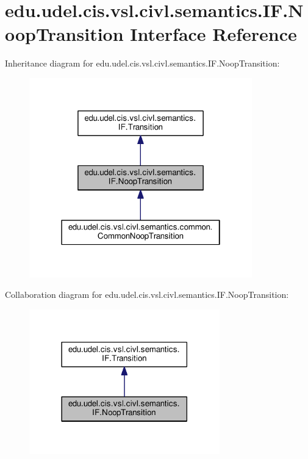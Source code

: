 \hypertarget{interfaceedu_1_1udel_1_1cis_1_1vsl_1_1civl_1_1semantics_1_1IF_1_1NoopTransition}{}\section{edu.\+udel.\+cis.\+vsl.\+civl.\+semantics.\+I\+F.\+Noop\+Transition Interface Reference}
\label{interfaceedu_1_1udel_1_1cis_1_1vsl_1_1civl_1_1semantics_1_1IF_1_1NoopTransition}


Inheritance diagram for edu.\+udel.\+cis.\+vsl.\+civl.\+semantics.\+I\+F.\+Noop\+Transition\+:
\nopagebreak
\begin{figure}[H]
\begin{center}
\leavevmode
\includegraphics[width=274pt]{interfaceedu_1_1udel_1_1cis_1_1vsl_1_1civl_1_1semantics_1_1IF_1_1NoopTransition__inherit__graph}
\end{center}
\end{figure}


Collaboration diagram for edu.\+udel.\+cis.\+vsl.\+civl.\+semantics.\+I\+F.\+Noop\+Transition\+:
\nopagebreak
\begin{figure}[H]
\begin{center}
\leavevmode
\includegraphics[width=234pt]{interfaceedu_1_1udel_1_1cis_1_1vsl_1_1civl_1_1semantics_1_1IF_1_1NoopTransition__coll__graph}
\end{center}
\end{figure}
